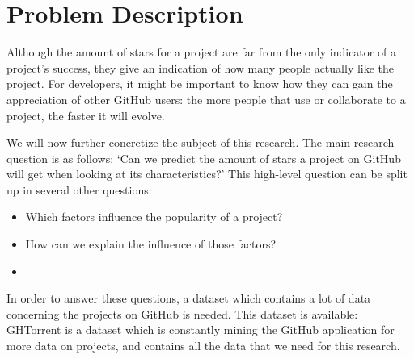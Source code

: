 \section{Problem Description}
    Although the amount of stars for a project are far from the only indicator of a project's success, they give an indication of how many people actually like the project.
    For developers, it might be important to know how they can gain the appreciation of other GitHub users: the more people that use or collaborate to a project, the faster it will evolve.

    We will now further concretize the subject of this research. 
    The main research question is as follows: `Can we predict the amount of stars a project on GitHub will get when looking at its characteristics?'
    This high-level question can be split up in several other questions:
    \begin{itemize}
        \item Which factors influence the popularity of a project?
        \item How can we explain the influence of those factors?
        \item {} 
    \end{itemize}
    
    In order to answer these questions, a dataset which contains a lot of data concerning the projects on GitHub is needed. 
    This dataset is available: GHTorrent \cite{gousios-2013} is a dataset which is constantly mining the GitHub application for more data on projects, and contains all the data that we need for this research.



